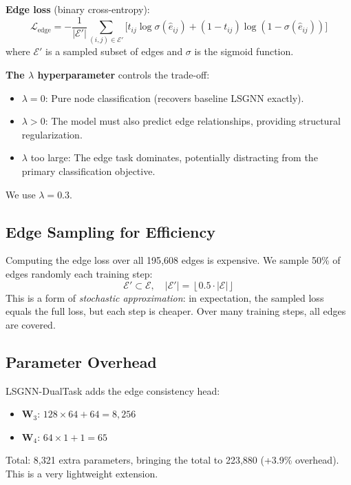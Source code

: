 \documentclass[conference]{IEEEtran}
\newcommand{\E}{\mathcal{E}}
\newcommand{\Loss}{\mathcal{L}}
\newcommand{\mat}[1]{\mathbf{#1}}
\begin{document}
\textbf{Edge loss} (binary cross-entropy):
\begin{equation}
    \Loss_{\text{edge}} = -\frac{1}{|\E'|} \sum_{(i,j) \in \E'} \Big[ t_{ij} \log \sigma(\hat{e}_{ij}) + (1 - t_{ij}) \log(1 - \sigma(\hat{e}_{ij})) \Big]
\end{equation}
where $\E'$ is a sampled subset of edges and $\sigma$ is the sigmoid function.

\textbf{The $\lambda$ hyperparameter} controls the trade-off:
\begin{itemize}
    \item $\lambda = 0$: Pure node classification (recovers baseline LSGNN exactly).
    \item $\lambda > 0$: The model must also predict edge relationships, providing structural regularization.
    \item $\lambda$ too large: The edge task dominates, potentially distracting from the primary classification objective.
\end{itemize}
We use $\lambda = 0.3$.

\subsection{Edge Sampling for Efficiency}

Computing the edge loss over all 195{,}608 edges is expensive. We sample 50\% of edges randomly each training step:
\begin{equation}
    \E' \subset \E, \quad |\E'| = \left\lfloor 0.5 \cdot |\E| \right\rfloor
\end{equation}
This is a form of \emph{stochastic approximation}: in expectation, the sampled loss equals the full loss, but each step is cheaper. Over many training steps, all edges are covered.

\subsection{Parameter Overhead}

LSGNN-DualTask adds the edge consistency head:
\begin{itemize}
    \item $\mat{W}_3$: $128 \times 64 + 64 = 8{,}256$
    \item $\mat{W}_4$: $64 \times 1 + 1 = 65$
\end{itemize}
Total: 8{,}321 extra parameters, bringing the total to 223{,}880 (+3.9\% overhead). This is a very lightweight extension.
\end{document}
